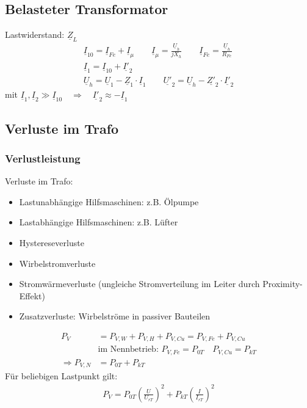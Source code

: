 \subsection{Belasteter Transformator}
    Lastwiderstand: \(\underline{Z}_L\)
    \begin{gather*}
        \underline{I}_{10} = \underline{I}_{Fe} + \underline{I}_{\mu} \qquad \underline{I}_\mu = \frac{\underline{U}_h}{jX_h} \qquad \underline{I}_{Fe} = \frac{\underline{U}_h}{R_{Fe}} \\
        \underline{I}_1 = \underline{I}_{10} + \underline{I'}_2 \\
        \underline{U}_h = \underline{U}_1 - \underline{Z}_1 \cdot \underline{I}_1 \qquad \underline{U'}_2 = \underline{U}_h - \underline{Z'}_2 \cdot \underline{I'}_2
    \end{gather*}
    mit \(\underline{I}_1, \underline{I}_2 \gg \underline{I}_{10} \quad \Rightarrow \quad \underline{I'}_2 \approx -\underline{I}_1\)

\subsection{Verluste im Trafo}
    \subsubsection{Verlustleistung}
        Verluste im Trafo:
        \begin{itemize}
            \item Lastunabhängige Hilfsmaschinen: z.B. Ölpumpe
            \item Lastabhängige Hilfsmaschinen: z.B. Lüfter
            \item Hystereseverluste
            \item Wirbelstromverluste
            \item Stromwärmeverluste (ungleiche Stromverteilung im Leiter durch Proximity-Effekt)
            \item Zusatzverluste: Wirbelströme in passiver Bauteilen
        \end{itemize}
        \vspace{-10pt}
        \begin{align*}
            P_V &= P_{V,W} + P_{V,H} + P_{V,Cu} = P_{V,Fe} + P_{V,Cu} \\
                &\text{im Nennbetrieb: } P_{V,Fe} = P_{0T} \quad P_{V,Cu} = P_{kT}\\
            \Rightarrow P_{V,N} &= P_{0T} + P_{kT}
        \end{align*}
        Für beliebigen Lastpunkt gilt:
        \begin{align*}
            \boxed{P_V = P_{0T} \left(\frac{U}{U_{rT}}\right)^2 + P_{kT} \left(\frac{I}{I_{rT}}\right)^2}
        \end{align*}

